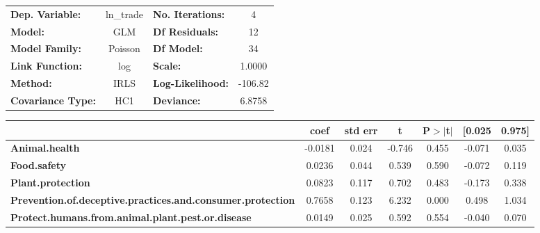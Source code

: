 \begin{center}
\begin{tabular}{lclc}
\toprule
\textbf{Dep. Variable:}                                            &   ln\_trade   & \textbf{  No. Iterations:    } &     4       \\
\textbf{Model:}                                                    &      GLM      & \textbf{  Df Residuals:      } &     12      \\
\textbf{Model Family:}                                             &    Poisson    & \textbf{  Df Model:          } &     34      \\
\textbf{Link Function:}                                            &      log      & \textbf{  Scale:             } &    1.0000   \\
\textbf{Method:}                                                   &      IRLS     & \textbf{  Log-Likelihood:    } &   -106.82   \\
\textbf{Covariance Type:}                                          &      HC1      & \textbf{  Deviance:          } &    6.8758   \\
\bottomrule
\end{tabular}
\begin{tabular}{lcccccc}
                                                                   & \textbf{coef} & \textbf{std err} & \textbf{t} & \textbf{P$> |$t$|$} & \textbf{[0.025} & \textbf{0.975]}  \\
\midrule
\textbf{Animal.health}                                             &      -0.0181  &        0.024     &    -0.746  &         0.455        &       -0.071    &        0.035     \\
\textbf{Food.safety}                                               &       0.0236  &        0.044     &     0.539  &         0.590        &       -0.072    &        0.119     \\
\textbf{Plant.protection}                                          &       0.0823  &        0.117     &     0.702  &         0.483        &       -0.173    &        0.338     \\
\textbf{Prevention.of.deceptive.practices.and.consumer.protection} &       0.7658  &        0.123     &     6.232  &         0.000        &        0.498    &        1.034     \\
\textbf{Protect.humans.from.animal.plant.pest.or.disease}          &       0.0149  &        0.025     &     0.592  &         0.554        &       -0.040    &        0.070     \\

\end{tabular}
\end{center}

